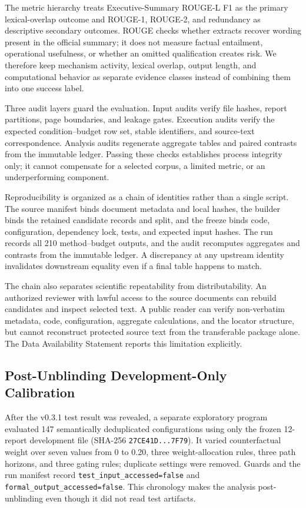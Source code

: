 \documentclass[applsci,article,submit,moreauthors]{Definitions/mdpi}
\begin{document}
The metric hierarchy treats Executive-Summary ROUGE-L F1 as the primary lexical-overlap outcome and ROUGE-1, ROUGE-2, and redundancy as descriptive secondary outcomes. ROUGE checks whether extracts recover wording present in the official summary; it does not measure factual entailment, operational usefulness, or whether an omitted qualification creates risk. We therefore keep mechanism activity, lexical overlap, output length, and computational behavior as separate evidence classes instead of combining them into one success label.

Three audit layers guard the evaluation. Input audits verify file hashes, report partitions, page boundaries, and leakage gates. Execution audits verify the expected condition--budget row set, stable identifiers, and source-text correspondence. Analysis audits regenerate aggregate tables and paired contrasts from the immutable ledger. Passing these checks establishes process integrity only; it cannot compensate for a selected corpus, a limited metric, or an underperforming component.

Reproducibility is organized as a chain of identities rather than a single script. The source manifest binds document metadata and local hashes, the builder binds the retained candidate records and split, and the freeze binds code, configuration, dependency lock, tests, and expected input hashes. The run records all 210 method--budget outputs, and the audit recomputes aggregates and contrasts from the immutable ledger. A discrepancy at any upstream identity invalidates downstream equality even if a final table happens to match.

The chain also separates scientific repeatability from distributability. An authorized reviewer with lawful access to the source documents can rebuild candidates and inspect selected text. A public reader can verify non-verbatim metadata, code, configuration, aggregate calculations, and the locator structure, but cannot reconstruct protected source text from the transferable package alone. The Data Availability Statement reports this limitation explicitly.

\subsection{Post-Unblinding Development-Only Calibration}

After the v0.3.1 test result was revealed, a separate exploratory program evaluated 147 semantically deduplicated configurations using only the frozen 12-report development file (SHA-256 \texttt{27CE41D...7F79}). It varied counterfactual weight over seven values from 0 to 0.20, three weight-allocation rules, three path horizons, and three gating rules; duplicate settings were removed. Guards and the run manifest record \texttt{test\_input\_accessed=false} and \texttt{formal\_output\_accessed=false}. This chronology makes the analysis post-unblinding even though it did not read test artifacts.
\end{document}
